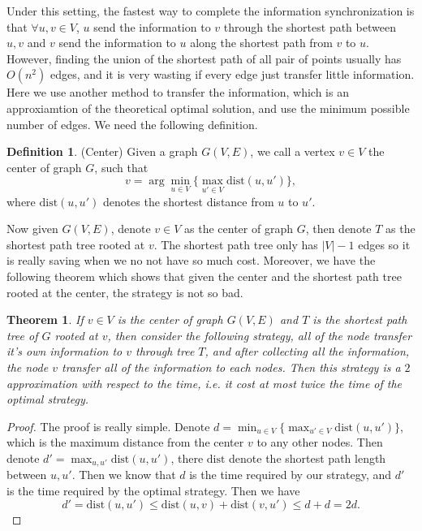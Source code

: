 \documentclass{article}
\theoremstyle{plain}
\newtheorem{thm}{Theorem}[section]
\theoremstyle{definition}
\newtheorem{defn}{Definition}[section]
\theoremstyle{remark}
\begin{document}
    Under this setting, the fastest way to complete the information synchronization is that $\forall u,v\in V$, $u$ send the information to $v$ through the shortest path between $u,v$ and $v$ send the information to $u$ along the shortest path from $v$ to $u$. However, finding the union of the shortest path of all pair of points usually has $O(n^2)$ edges, and it is very wasting if every edge just transfer little information.\\

    Here we use another method to transfer the information, which is an approxiamtion of the theoretical optimal solution, and use the minimum possible number of edges. We need the following definition.

    \begin{defn}\label{center}
        (Center) Given a graph $G(V,E)$, we call a vertex $v\in V$ the center of graph $G$, such that
        \[v = \arg\min_{u\in V}\{\max_{u'\in V}\text{dist}(u,u')\},\]
        where $\text{dist}(u,u')$ denotes the shortest distance from $u$ to $u'$.
    \end{defn}

    Now given $G(V,E)$, denote $v\in V$ as the center of graph $G$, then denote $T$ as the shortest path tree rooted at $v$. The shortest path tree only has $|V|-1$ edges so it is really saving when we no not have so much cost. Moreover, we have the following theorem which shows that given the center and the shortest path tree rooted at the center, the strategy is not so bad.

    \begin{thm}
        If $v\in V$ is the center of graph $G(V,E)$ and $T$ is the shortest path tree of $G$ rooted at $v$, then consider the following strategy, all of the node transfer it's own information to $v$ through tree $T$, and after collecting all the information, the node $v$ transfer all of the information to each nodes. Then this strategy is a $2$ approximation with respect to the time, i.e. it cost at most twice the time of the optimal strategy.
    \end{thm}

    \begin{proof}
        The proof is really simple. Denote $d = \min_{u\in V}\{\max_{u'\in V}\text{dist}(u,u')\}$, which is the maximum distance from the center $v$ to any other nodes. Then denote $d' = \max_{u,u'}\text{dist}(u,u')$, there $\text{dist}$ denote the shortest path length between $u,u'$. Then we know that $d$ is the time required by our strategy, and $d'$ is the time required by the optimal strategy. Then we have
        \[d' = \text{dist}(u,u') \le \text{dist}(u,v) + \text{dist}(v,u') \le d + d = 2d.\]
    \end{proof}
\end{document}
